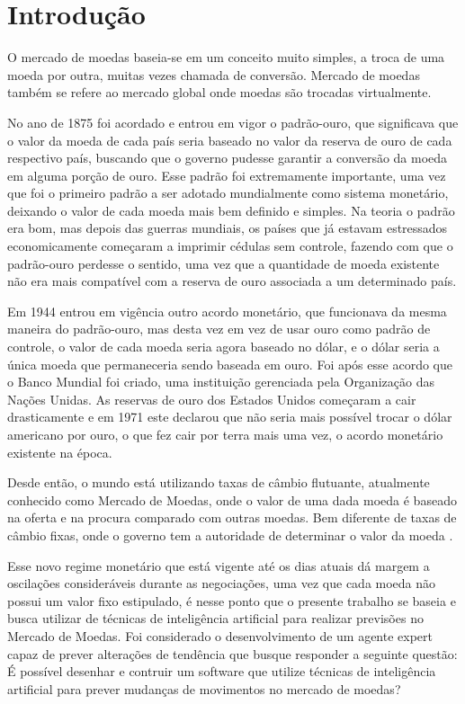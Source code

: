 \chapter[Introdução]{Introdução}

O mercado de moedas baseia-se em um conceito muito simples, a troca de uma moeda
por outra, muitas vezes chamada de conversão. Mercado de moedas também se refere
ao mercado global onde moedas são trocadas virtualmente.

No ano de 1875 foi acordado e entrou em vigor o padrão-ouro, que significava que o
valor da moeda de cada país seria baseado no valor da reserva de ouro de cada respectivo
país, buscando que o governo pudesse garantir a conversão da moeda em alguma porção
de ouro. Esse padrão foi extremamente importante, uma vez que foi o primeiro padrão
a ser adotado mundialmente como sistema monetário, deixando o valor de cada moeda mais
bem definido e simples. Na teoria o padrão era bom, mas depois das guerras mundiais,
os países que já estavam estressados economicamente começaram a imprimir cédulas sem controle,
fazendo com que o padrão-ouro perdesse o sentido, uma vez que a quantidade de moeda existente
não era mais compatível com a reserva de ouro associada a um determinado país.

Em 1944 entrou em vigência outro acordo monetário, que funcionava da mesma maneira do padrão-ouro,
mas desta vez em vez de usar ouro como padrão de controle, o valor de cada moeda seria agora baseado
no dólar, e o dólar seria a única moeda que permaneceria sendo baseada em ouro. Foi após esse acordo
que o Banco Mundial foi criado, uma instituição gerenciada pela Organização das Nações Unidas. As reservas
de ouro dos Estados Unidos começaram a cair drasticamente e em 1971 este declarou que não seria mais possível
trocar o dólar americano por ouro, o que fez cair por terra mais uma vez, o acordo monetário existente na época.

Desde então, o mundo está utilizando taxas de câmbio flutuante, atualmente conhecido como Mercado de Moedas, onde
o valor de uma dada moeda é baseado na oferta e na procura comparado com outras moedas. Bem diferente de taxas de câmbio fixas,
onde o governo tem a autoridade de determinar o valor da moeda \cite{investopedia}.

Esse novo regime monetário que está vigente até os dias atuais dá margem a oscilações consideráveis durante as negociações, uma vez
que cada moeda não possui um valor fixo estipulado, é nesse ponto que o presente trabalho se baseia e busca utilizar de técnicas de
inteligência artificial para realizar previsões no Mercado de Moedas. Foi considerado o desenvolvimento de um agente expert capaz de prever
alterações de tendência que busque responder a seguinte questão: É possível desenhar e contruir um software que utilize técnicas de
inteligência artificial para prever mudanças de movimentos no mercado de moedas?



